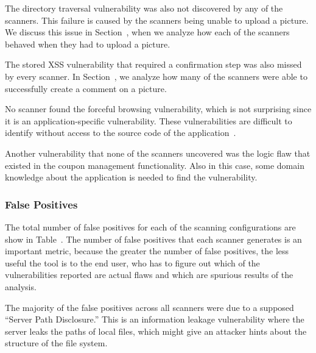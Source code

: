 The directory traversal vulnerability was also not discovered by any of the
scanners. This failure is caused by the scanners being unable to
upload a picture. We
discuss this issue in Section~, when we analyze how each of the
scanners behaved when they had to upload a picture.

The stored XSS vulnerability that required a confirmation step was also missed
by every scanner. In Section~, we analyze how many of
the scanners were able to successfully create a comment on a picture.

No scanner found the forceful browsing vulnerability, which is not 
surprising since it is an application-specific
vulnerability. These vulnerabilities are difficult to identify
without access to the source code of the application~\cite{balzarotti07:mimosa}.

Another vulnerability that none of the scanners uncovered was the
logic flaw that existed in the coupon management functionality. 
Also in this case, some domain knowledge about the application is needed to
find the vulnerability.




\subsubsection{False Positives}

The total number of false positives for each of the scanning
configurations are show in Table~.
The number 
of false positives that each scanner generates is an important metric, because
the greater the number of false positives, the less useful the tool is to the
end user, who has to figure out which of the vulnerabilities reported are actual
flaws and which are spurious results of the analysis. 

The majority of the false positives across all scanners were due to a supposed
``Server Path Disclosure.'' This is an information leakage vulnerability where
the server leaks the paths of local files, which might give an attacker 
hints about the structure of the file system.

